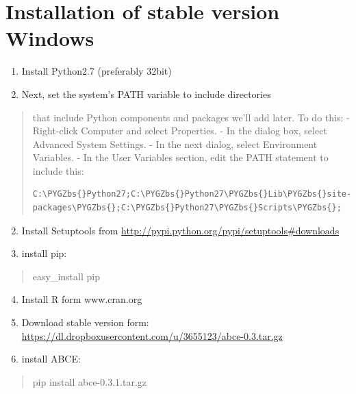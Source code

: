 \documentclass[letterpaper,10pt,english]{sphinxmanual}
\def\PYGZbs{\char`\\}
\begin{document}
\section{Installation of stable version Windows}
\label{installation:installation-of-stable-version-windows}\begin{enumerate}
\item {} 
Install Python2.7 (preferably 32bit)

\item {} 
Next, set the system’s PATH variable to include directories

\end{enumerate}
\begin{quote}

that include Python components and packages we’ll add later. To do this:
- Right-click Computer and select Properties.
- In the dialog box, select Advanced  System Settings.
- In the next dialog, select Environment Variables.
- In the User Variables section, edit the PATH statement to include this:

\begin{Verbatim}[commandchars=\\\{\}]
C:\PYGZbs{}Python27;C:\PYGZbs{}Python27\PYGZbs{}Lib\PYGZbs{}site-packages\PYGZbs{};C:\PYGZbs{}Python27\PYGZbs{}Scripts\PYGZbs{};
\end{Verbatim}
\end{quote}
\begin{enumerate}
\setcounter{enumi}{1}
\item {} 
Install Setuptools from \href{http://pypi.python.org/pypi/setuptools\#downloads}{http://pypi.python.org/pypi/setuptools\#downloads}

\item {} 
install pip:

\end{enumerate}
\begin{quote}

easy\_install pip
\end{quote}
\begin{enumerate}
\setcounter{enumi}{3}
\item {} 
Install R form www.cran.org

\item {} 
Download stable version form:  \href{https://dl.dropboxusercontent.com/u/3655123/abce-0.3.tar.gz}{https://dl.dropboxusercontent.com/u/3655123/abce-0.3.tar.gz}

\item {} 
install ABCE:

\end{enumerate}
\begin{quote}

pip install abce-0.3.1.tar.gz
\end{quote}
\end{document}
